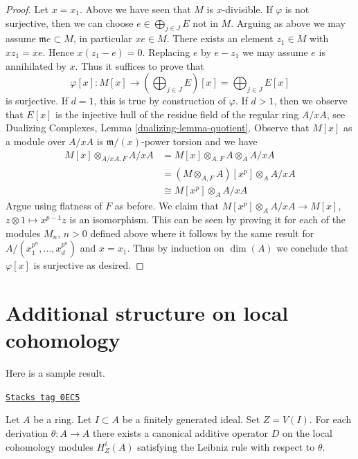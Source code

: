 \begin{proof}
\medskip\noindent
Let $x = x_1$. Above we have seen that $M$ is $x$-divisible.
If $\varphi$ is not surjective, then we can choose
$e \in \bigoplus_{j \in J} E$ not in $M$.
Arguing as above we may assume $\mathfrak m e \subset M$,
in particular $x e \in M$. There exists an element
$z_1 \in M$ with $x z_1 = x e$. Hence
$x(z_1 - e) = 0$. Replacing $e$ by $e - z_1$
we may assume $e$ is annihilated by $x$.
Thus it suffices to prove that
$$
\varphi[x] :
M[x]
\longrightarrow
\left(\bigoplus\nolimits_{j \in J} E\right)[x] =
\bigoplus\nolimits_{j \in J} E[x]
$$
is surjective. If $d = 1$, this is true by construction of $\varphi$.
If $d > 1$, then we observe that $E[x]$ is the injective hull
of the residue field of the regular ring $A/xA$, see
Dualizing Complexes, Lemma \ref{dualizing-lemma-quotient}.
Observe that $M[x]$ as a module over $A/xA$
is $\mathfrak m/(x)$-power torsion and we have
\begin{align*}
M[x] \otimes_{A/xA, F} A/xA
& = M[x] \otimes_{A, F} A \otimes_A A/xA \\
& = (M \otimes_{A, F} A)[x^p] \otimes_A A/xA \\
& \cong M[x^p] \otimes_A A/xA
\end{align*}
Argue using flatness of $F$ as before.
We claim that $M[x^p] \otimes_A A/xA \to M[x]$,
$z \otimes 1 \mapsto x^{p - 1}z$ is an isomorphism.
This can be seen by proving it for
each of the modules $M_n$, $n > 0$ defined above
where it follows by the same result for
$A/(x_1^{p^n}, \ldots, x_d^{p^n})$ and $x = x_1$.
Thus by induction on $\dim(A)$ we conclude that $\varphi[x]$
is surjective as desired.
\end{proof}

\section{Additional structure on local cohomology}
\label{local-cohomology-section-additional}
Here is a sample result.

\begin{lemma}[Derivation]
\label{local-cohomology-lemma-derivation}
\href{https://stacks.math.columbia.edu/tag/0EC5}{\texttt{Stacks tag 0EC5}}

Let $A$ be a ring. Let $I \subset A$ be a finitely generated ideal.
Set $Z = V(I)$.
For each derivation $\theta : A \to A$ there exists a canonical
additive operator $D$ on the local cohomology modules
$H^i_Z(A)$ satisfying the Leibniz rule with respect to $\theta$.
\end{lemma}

